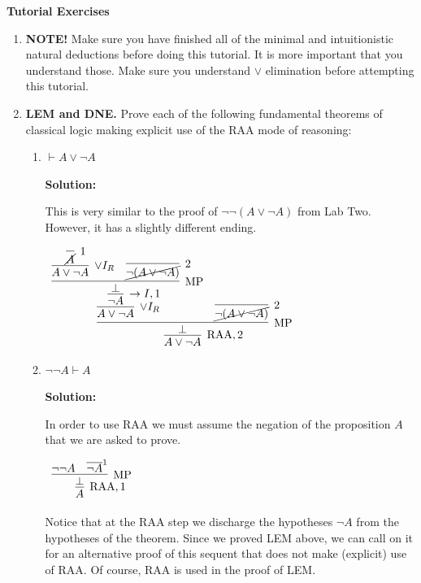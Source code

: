 \documentclass[11pt]{report}
\newcommand{\temp}[2]{{\overline{#2}}^{#1}}
\begin{document}
\newpage
{\bf Tutorial Exercises}
\begin{enumerate}

	\item \textbf{NOTE!} Make sure you have finished all of the minimal and intuitionistic natural deductions before doing this tutorial. It is more important that you understand those. Make sure you understand $\lor$ elimination before attempting this tutorial. 
	
	\item \textbf{LEM and DNE.} Prove each of the following fundamental theorems of classical logic making explicit use of the RAA mode of reasoning: 
	
	\begin{enumerate}
		\item $\vdash A \lor \neg A$
		
		\textbf{Solution:}

		This is very similar to the proof of $\lnot \lnot (A \lor \lnot A)$ from Lab Two. However, it has a slightly different ending.

			\begin{center}
				$\begin{array}{c}
					\infer[\RAA,2]{A \lor \lnot A}
						{\infer[\MP]{\bot}
							{\infer[\lor I_{R}]{A \lor \lnot A}
								{\infer[\to I,1]{\lnot A}
									{\infer[\MP]{\bot}
										{\infer[\lor I_{R}]{A \lor \lnot A}{\infer[1]{\cancel{A}}{}}
										&
										\infer[2]{\cancel{\lnot (A \lor \lnot A)}}{}}}}
							&
							\infer[2]{\cancel{\lnot(A \lor \lnot A)}}{}}}
				\end{array}$
			\end{center}

		\item $\neg\neg A \vdash A$ 
		
		\textbf{Solution:}

			In order to use RAA we must assume the negation of the proposition $A$ that we are asked to prove. 

			\begin{center}
				$\begin{array}{c}
					\infer[\RAA,1]{A}
						{\infer[\MP]{\bot}
							{\lnot \lnot A
							&
							\temp{1}{\lnot A}}}
				\end{array}$
			\end{center}

			Notice that at the RAA step we discharge the hypotheses $\lnot A$ from the hypotheses of the theorem. Since we proved LEM above, we can call on it for an alternative proof of this sequent that does not make (explicit) use of RAA. Of course, RAA is used in the proof of LEM. 


\end{enumerate}
\end{enumerate}
\end{document}
